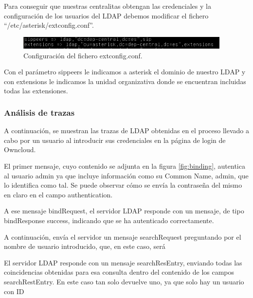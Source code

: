 \documentclass[a4paper]{article}
\begin{document}
Para conseguir que nuestras centralitas obtengan las credenciales y la configuración de los usuarios del LDAP debemos modificar el fichero ``/etc/asterisk/extconfig.conf''.

\begin{figure}[htb]
    \begin{center}
        \includegraphics[width=0.95\textwidth]{ldap/extconfig.png}
        \caption{Configuración del fichero extconfig.conf.}
         \label{fig:extconfig}
    \end{center}
\end{figure}

Con el parámetro sippeers le indicamos a asterisk el dominio de nuestro LDAP y con extensions le indicamos la unidad organizativa donde se encuentran incluidas todas las extensiones.

\subsubsection{Análisis de trazas}
A continuación, se muestran las trazas de LDAP obtenidas en el proceso llevado a cabo
por un usuario al introducir sus credenciales en la página de login de Owncloud.


El primer mensaje, cuyo contenido se adjunta en la figura \ref{fig:binding}, autentica al usuario
admin ya que incluye información como su Common Name, admin, que lo identifica como tal. Se puede observar cómo se envía la contraseña del mismo en claro en el
campo authentication.

\label{fig:binding}

A ese mensaje bindRequest, el servidor LDAP responde con un mensaje, de tipo bindResponse success, indicando que se ha autenticado correctamente.

A continuación, envía el servidor un mensaje searchRequest preguntando por el nombre de usuario introducido, que, en este caso, será %


El servidor LDAP responde con un mensaje searchResEntry, enviando todas las coincidencias obtenidas para esa consulta dentro del contenido de los campos searchRestEntry. En este caso tan solo devuelve uno, ya que solo hay un usuario con ID %
\end{document}
